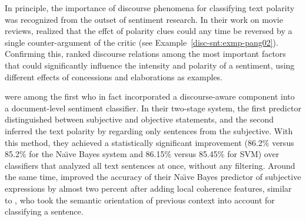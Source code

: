 

In principle, the importance of discourse phenomena for classifying
text polarity was recognized from the outset of sentiment research.
In their work on movie reviews,  realized that 
the effct of polarity clues could any time be
reversed by a single counter-argument of the critic (see
Example~\ref{disc-snt:exmp-pang02}).  Confirming this,  ranked discourse relations among
the most important factors that could significantly influence the
intensity and polarity of a sentiment, using different effects of concessions and elaborations as examples. 

 were among the first who in fact incorporated a
discourse-aware component into a document-level sentiment classifier.
In their two-stage system, the first
predictor distinguished between subjective and objective statements, and the second 
inferred the text polarity by regarding only
sentences from the subjective.  With this method,
they achieved a statistically significant improvement
(86.2\% versus 85.2\% for the Na\"{\i}ve Bayes system and 86.15\%
versus 85.45\% for SVM) over classifiers that analyzed all text
sentences at once, without any filtering.
Around the same time,   improved the
accuracy of their Na\"{\i}ve Bayes predictor of subjective expressions
by almost two percent after adding local coherence features, similar to 
, who took the semantic orientation of
previous context into account for classifying a sentence.

